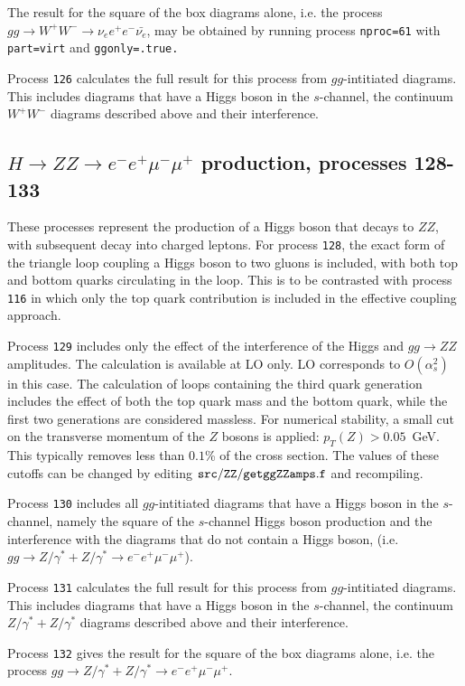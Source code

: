 \documentclass[12pt]{article}
\begin{document}
The result for the square of the box diagrams alone, i.e. the process
$gg \to W^+W^- \to \nu_e e^+ e^- \bar{\nu_e}$, may be obtained by running process
{\tt nproc=61} with {\tt part=virt} and {\tt ggonly=.true.} 

Process {\tt 126} calculates the full result for this process from  $gg$-intitiated diagrams.
This includes diagrams that have a Higgs boson in the $s$-channel, the continuum $W^+W^-$
diagrams described above and their interference. 


\subsection{$H \to ZZ \to e^- e^+ \mu^- \mu^+$ production, processes 128-133}
These processes represent the production of a Higgs boson that decays to $Z Z$,
with subsequent decay into charged leptons. For process {\tt 128}, the exact form of the triangle
loop coupling a Higgs boson to two gluons is included, with both top and bottom quarks
circulating in the loop. This is to be contrasted with process {\tt 116} in which only the
top quark contribution is included in the effective coupling approach.

Process {\tt 129} includes only the effect of the interference of the
Higgs and $gg \to ZZ$ amplitudes.
The calculation is available at LO only. LO corresponds to $O(\alpha_s^2)$ in this case.
The calculation of loops containing the third quark generation
includes the effect of both the top quark mass and the bottom quark, while the first two
generations are considered massless. For numerical stability, a small cut on the
transverse momentum of the $Z$ bosons is applied: $p_T(Z)>0.05$~GeV.
This typically removes less than $0.1$\% of the cross section. The
values of these cutoffs can be changed by editing ${\tt src/ZZ/getggZZamps.f}$ and recompiling.

Process {\tt 130} includes all $gg$-intitiated diagrams that have a Higgs boson in the $s$-channel,
namely the square of the $s$-channel Higgs boson production and the interference with the diagrams
that do not contain a Higgs boson, (i.e. $gg \to Z/\gamma^*+Z/\gamma^* \to e^- e^+ \mu^- \mu^+$).

Process {\tt 131} calculates the full result for this process from  $gg$-intitiated diagrams.
This includes diagrams that have a Higgs boson in the $s$-channel, the continuum $ Z/\gamma^*+Z/\gamma^*$
diagrams described above and their interference. 

Process {\tt 132}  gives the result for the square of the box diagrams alone, i.e. the process
$gg \to Z/\gamma^*+Z/\gamma^* \to e^- e^+ \mu^- \mu^+$.
\end{document}
